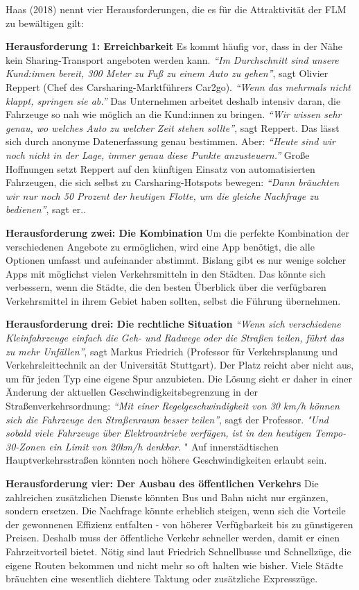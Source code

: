 \documentclass[
]{book}
\begin{document}
Haas (2018) nennt vier Herausforderungen, die es für die Attraktivität der FLM zu bewältigen gilt:

\textbf{Herausforderung 1: Erreichbarkeit}
Es kommt häufig vor, dass in der Nähe kein Sharing-Transport angeboten werden kann. \emph{``Im Durchschnitt sind unsere Kund:innen bereit, 300 Meter zu Fuß zu einem Auto zu gehen''}, sagt Olivier Reppert (Chef des Carsharing-Marktführers Car2go). \emph{``Wenn das mehrmals nicht klappt, springen sie ab.''} Das Unternehmen arbeitet deshalb intensiv daran, die Fahrzeuge so nah wie möglich an die Kund:innen zu bringen. \emph{``Wir wissen sehr genau, wo welches Auto zu welcher Zeit stehen sollte''}, sagt Reppert. Das lässt sich durch anonyme Datenerfassung genau bestimmen. Aber: \emph{``Heute sind wir noch nicht in der Lage, immer genau diese Punkte anzusteuern.'' } Große Hoffnungen setzt Reppert auf den künftigen Einsatz von automatisierten Fahrzeugen, die sich selbst zu Carsharing-Hotspots bewegen: \emph{``Dann bräuchten wir nur noch 50 Prozent der heutigen Flotte, um die gleiche Nachfrage zu bedienen''}, sagt er..

\textbf{Herausforderung zwei: Die Kombination}
Um die perfekte Kombination der verschiedenen Angebote zu ermöglichen, wird eine App benötigt, die alle Optionen umfasst und aufeinander abstimmt. Bislang gibt es nur wenige solcher Apps mit möglichst vielen Verkehrsmitteln in den Städten. Das könnte sich verbessern, wenn die Städte, die den besten Überblick über die verfügbaren Verkehrsmittel in ihrem Gebiet haben sollten, selbst die Führung übernehmen.

\textbf{Herausforderung drei: Die rechtliche Situation}
\emph{``Wenn sich verschiedene Kleinfahrzeuge einfach die Geh- und Radwege oder die Straßen teilen, führt das zu mehr Unfällen''}, sagt Markus Friedrich (Professor für Verkehrsplanung und Verkehrsleittechnik an der Universität Stuttgart). Der Platz reicht aber nicht aus, um für jeden Typ eine eigene Spur anzubieten. Die Lösung sieht er daher in einer Änderung der aktuellen Geschwindigkeitsbegrenzung in der Straßenverkehrsordnung: \emph{``Mit einer Regelgeschwindigkeit von 30 km/h können sich die Fahrzeuge den Straßenraum besser teilen''}, sagt der Professor. \emph{"Und sobald viele Fahrzeuge über Elektroantriebe verfügen, ist in den heutigen Tempo-30-Zonen ein Limit von 20km/h denkbar. }" Auf innerstädtischen Hauptverkehrsstraßen könnten noch höhere Geschwindigkeiten erlaubt sein.

\textbf{Herausforderung vier: Der Ausbau des öffentlichen Verkehrs}
Die zahlreichen zusätzlichen Dienste könnten Bus und Bahn nicht nur ergänzen, sondern ersetzen. Die Nachfrage könnte erheblich steigen, wenn sich die Vorteile der gewonnenen Effizienz entfalten - von höherer Verfügbarkeit bis zu günstigeren Preisen. Deshalb muss der öffentliche Verkehr schneller werden, damit er einen Fahrzeitvorteil bietet. Nötig sind laut Friedrich Schnellbusse und Schnellzüge, die eigene Routen bekommen und nicht mehr so oft halten wie bisher. Viele Städte bräuchten eine wesentlich dichtere Taktung oder zusätzliche Expresszüge.
\end{document}
